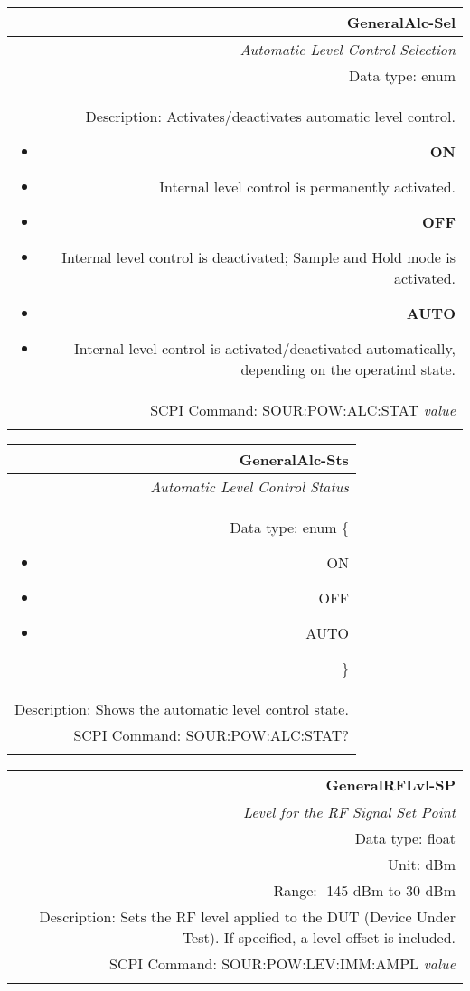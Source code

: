\documentclass[openany]{article}
\begin{document}
		\begin{tabular}{N}
			\hline
			\bfseries GeneralAlc-Sel \\ \hline
			\emph{Automatic Level Control Selection} \\
			Data type: enum \\
			Description: Activates/deactivates automatic level control. \begin{itemize}[noitemsep]
				\small
				\item[] \textbf{ON}
				\item[] Internal level control is permanently activated.
				\item[] \textbf{OFF}
				\item[] Internal level control is deactivated; Sample and Hold mode is activated.
				\item[] \textbf{AUTO}
				\item[] Internal level control is activated/deactivated automatically, depending on the operatind state.
			\end{itemize} \\
			SCPI Command: SOUR:POW:ALC:STAT \emph{value} \\
			\\ 

		\end{tabular}


		\begin{tabular}{N}
			\hline
			\bfseries GeneralAlc-Sts \\ \hline
			\emph{Automatic Level Control Status} \\
			Data type: enum \{\begin{itemize}[noitemsep]
				\small
				\item[] ON
				\item[] OFF
				\item[] AUTO
			\end{itemize}\} \\
			Description: Shows the automatic level control state. \\
			SCPI Command: SOUR:POW:ALC:STAT? \\
			\\ 

		\end{tabular}


		\begin{tabular}{N}
			\hline
			\bfseries GeneralRFLvl-SP \\ \hline
			\emph{Level for the RF Signal Set Point} \\
			Data type: float \\
			Unit: dBm \\
			Range: -145 dBm to 30 dBm \\
			Description: Sets the RF level applied to the DUT (Device Under Test). If specified, a level offset is included. \\
			SCPI Command: SOUR:POW:LEV:IMM:AMPL \emph{value} \\
			\\
			
		\end{tabular}
\end{document}
